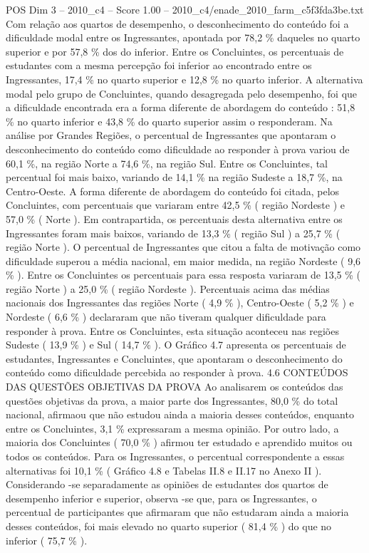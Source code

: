 \begin{textsample}{POS Dim 3 – 2010\_c4 – Score 1.00 – 2010\_c4/enade\_2010\_farm\_c5f3fda3be.txt}
Com relação aos quartos de desempenho, o desconhecimento do conteúdo foi a dificuldade modal entre os Ingressantes, apontada por 78,2 \% daqueles no quarto superior e por 57,8 \% dos do inferior.
Entre os Concluintes, os percentuais de estudantes com a mesma percepção foi inferior ao encontrado entre os Ingressantes, 17,4 \% no quarto superior e 12,8 \% no quarto inferior.
A alternativa modal pelo grupo de Concluintes, quando desagregada pelo desempenho, foi que a dificuldade encontrada era a forma diferente de abordagem do conteúdo : 51,8 \% no quarto inferior e 43,8 \% do quarto superior assim o responderam.
Na análise por Grandes Regiões, o percentual de Ingressantes que apontaram o desconhecimento do conteúdo como dificuldade ao responder à prova variou de 60,1 \%, na região Norte a 74,6 \%, na região Sul.
Entre os Concluintes, tal percentual foi mais baixo, variando de 14,1 \% na região Sudeste a 18,7 \%, na Centro-Oeste.
A forma diferente de abordagem do conteúdo foi citada, pelos Concluintes, com percentuais que variaram entre 42,5 \% ( região Nordeste ) e 57,0 \% ( Norte ).
Em contrapartida, os percentuais desta alternativa entre os Ingressantes foram mais baixos, variando de 13,3 \% ( região Sul ) a 25,7 \% ( região Norte ).
O percentual de Ingressantes que citou a falta de motivação como dificuldade superou a média nacional, em maior medida, na região Nordeste ( 9,6 \% ).
Entre os Concluintes os percentuais para essa resposta variaram de 13,5 \% ( região Norte ) a 25,0 \% ( região Nordeste ).
Percentuais acima das médias nacionais dos Ingressantes das regiões Norte ( 4,9 \% ), Centro-Oeste ( 5,2 \% ) e Nordeste ( 6,6 \% ) declararam que não tiveram qualquer dificuldade para responder à prova.
Entre os Concluintes, esta situação aconteceu nas regiões Sudeste ( 13,9 \% ) e Sul ( 14,7 \% ).
O Gráfico 4.7 apresenta os percentuais de estudantes, Ingressantes e Concluintes, que apontaram o desconhecimento do conteúdo como dificuldade percebida ao responder à prova. 4.6 CONTEÚDOS DAS QUESTÕES OBJETIVAS DA PROVA Ao analisarem os conteúdos das questões objetivas da prova, a maior parte dos Ingressantes, 80,0 \% do total nacional, afirmaou que não estudou ainda a maioria desses conteúdos, enquanto entre os Concluintes, 3,1 \% expressaram a mesma opinião.
Por outro lado, a maioria dos Concluintes ( 70,0 \% ) afirmou ter estudado e aprendido muitos ou todos os conteúdos.
Para os Ingressantes, o percentual correspondente a essas alternativas foi 10,1 \% ( Gráfico 4.8 e Tabelas II.8 e II.17 no Anexo II ).
Considerando -se separadamente as opiniões de estudantes dos quartos de desempenho inferior e superior, observa -se que, para os Ingressantes, o percentual de participantes que afirmaram que não estudaram ainda a maioria desses conteúdos, foi mais elevado no quarto superior ( 81,4 \% ) do que no inferior ( 75,7 \% ).

\end{textsample}
